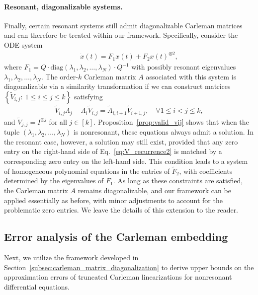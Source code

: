 \documentclass[superscriptaddress,onecolumn,nofootinbib,longbibliography,a4paper,accepted=2026-09-29]{quantumarticle}
\theoremstyle{plain}
\theoremstyle{definition}
\numberwithin{thm}{section}
\numberwithin{assumption}{section}
\numberwithin{lemma}{section}
\numberwithin{prop}{section}
\numberwithin{cor}{section}
\numberwithin{definition}{section}
\numberwithin{rmk}{section}
\numberwithin{equation}{section}
\newcommand{\lrcb}[1]{\left \{ #1 \right \}}
\begin{document}
\paragraph{Resonant, diagonalizable systems.} Finally, certain resonant systems still admit diagonalizable Carleman matrices and can therefore be treated within our framework. Specifically, consider the ODE system
\begin{align}
\dot{x}(t) = F_1 x(t) + F_2 x(t)^{\otimes 2},
\end{align}
where $F_1 = Q \cdot \mathrm{diag}(\lambda_1, \lambda_2, \dots, \lambda_N) \cdot Q^{-1}$ with possibly resonant eigenvalues $\lambda_1, \lambda_2, \dots, \lambda_N$. The order-$k$ Carleman matrix $A$ associated with this system is diagonalizable via a similarity transformation if we can construct matrices $\lrcb{\tilde{V}_{i,j}:~1\le i\le j\le k}$ satisfying
\begin{align}
\tilde{V}_{i,j} \Lambda_j - \Lambda_i \tilde{V}_{i,j} = \tilde{A}_{i,i+1} \tilde{V}_{i+1,j}, \quad \forall 1 \le i < j \le k,
\label{eq:V_recurrence2}
\end{align}
and $\tilde{V}_{j,j}=I^{\otimes j}$ for all $j \in [k]$. Proposition~\ref{prop:valid_vij} shows that when the tuple $(\lambda_1, \lambda_2, \dots, \lambda_N)$ is nonresonant, these equations always admit a solution. In the resonant case, however, a solution may still exist, provided that any zero entry on the right-hand side of Eq.~\eqref{eq:V_recurrence2} is matched by a corresponding zero entry on the left-hand side. This condition leads to a system of homogeneous polynomial equations in the entries of $\tilde{F}_2$, with coefficients determined by the eigenvalues of $F_1$. As long as these constraints are satisfied, the Carleman matrix $A$ remains diagonalizable, and our framework can be applied essentially as before, with minor adjustments to account for the problematic zero entries. We leave the details of this extension to the reader.


\subsection{Error analysis of the Carleman embedding}
\label{subsec:error_analysis_nonresonant_systems}

Next, we utilize the framework developed in Section~\ref{subsec:carleman_matrix_diagonalization} to derive upper bounds on the approximation errors of truncated Carleman linearizations for nonresonant differential equations.
\end{document}
